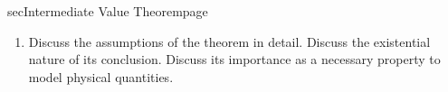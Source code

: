 \documentclass[../main]{subfiles}
\begin{document}
\begin{outline}{sec}{Intermediate Value Theorem}{page}
\begin{enumerate}
          \begin{mdframed}[style=simple]
            Suppose \(f(t)\) is continuous on the closed interval \([a,b]\) and let \(N\) be any number between \(f(a)\) and \(f(b)\), where \(f(a) \ne f(b)\). Then \textit{there exists} a number \(c\) in \((a,b)\) such that \(f(c) = N\).
          \end{mdframed}

          The \emph{intermediate value} is \(f(c)\) because \(a < c < b\), and \(f(a) < f(c) < f(b)\) or \(f(b) < f(c) < f(a)\).

    \item Discuss the assumptions of the theorem in detail.  Discuss the existential nature of its conclusion.  Discuss its importance as a necessary property to model physical quantities.



\end{enumerate}
\end{outline}
\end{document}
